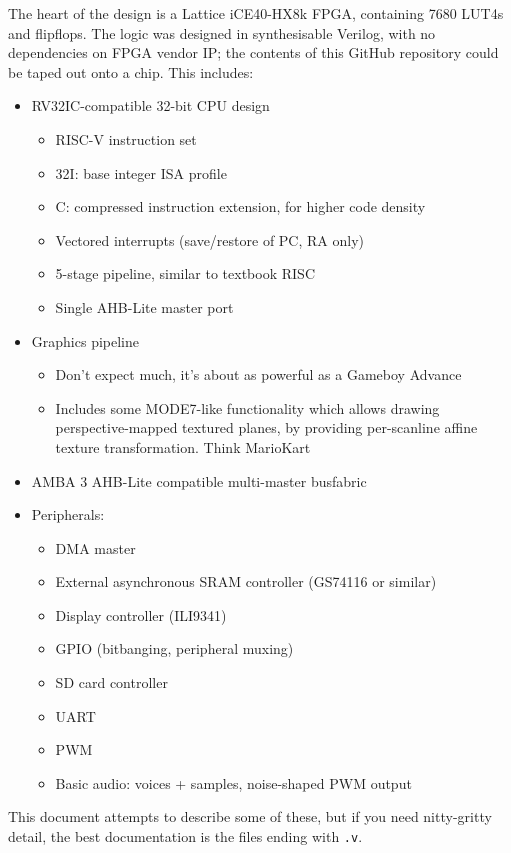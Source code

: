 \documentclass[notitlepage]{article}
\begin{document}
The heart of the design is a Lattice iCE40-HX8k FPGA, containing 7680 LUT4s and flipflops. The logic was designed in synthesisable Verilog, with no dependencies on FPGA vendor IP; the contents of this GitHub repository could be taped out onto a chip. This includes:

\begin{itemize}
\item RV32IC-compatible 32-bit CPU design
	\begin{itemize}
	\item RISC-V instruction set
	\item 32I: base integer ISA profile
	\item C: compressed instruction extension, for higher code density
	\item Vectored interrupts (save/restore of PC, RA only)
	\item 5-stage pipeline, similar to textbook RISC
	\item Single AHB-Lite master port
	\end{itemize}
\item Graphics pipeline
	\begin{itemize}
	\item Don't expect much, it's about as powerful as a Gameboy Advance
	\item Includes some MODE7-like functionality which allows drawing perspective-mapped textured planes, by providing per-scanline affine texture transformation. Think MarioKart
	\end{itemize}
\item AMBA 3 AHB-Lite compatible multi-master busfabric
\item Peripherals:
	\begin{itemize}
	\item DMA master
	\item External asynchronous SRAM controller (GS74116 or similar)
	\item Display controller (ILI9341)
	\item GPIO (bitbanging, peripheral muxing)
	\item SD card controller
	\item UART
	\item PWM
	\item Basic audio: voices + samples, noise-shaped PWM output
	\end{itemize}
\end{itemize}

This document attempts to describe some of these, but if you need nitty-gritty detail, the best documentation is the files ending with \texttt{.v}.
\end{document}
